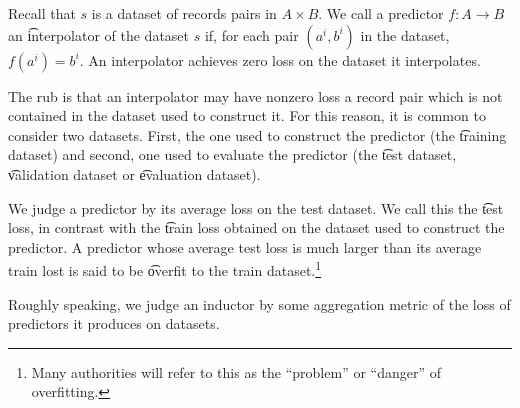 Recall that $s$ is a dataset of records pairs in $A \times B$.
We call a predictor $f: A \to B$ an \t{interpolator} of the dataset $s$ if, for each pair $(a^i, b^i)$ in the dataset, $f(a^i) = b^i$.
An interpolator achieves zero loss on the dataset it interpolates.

The rub is that an interpolator may have nonzero loss a record pair which is not contained in the dataset used to construct it.
For this reason, it is common to consider two datasets.
First, the one used to construct the predictor (the \t{training dataset}) and second, one used to evaluate the predictor (the \t{test dataset}, \t{validation dataset} or \t{evaluation dataset}).

We judge a predictor by its average loss on the test dataset.
We call this the \t{test loss}, in contrast with the \t{train loss} obtained on the dataset used to construct the predictor.
A predictor whose average test loss is much larger than its average train lost is said to be \t{overfit} to the train dataset.\footnote{Many authorities will refer to this as the ``problem'' or ``danger'' of overfitting.}

Roughly speaking, we judge an inductor by some aggregation metric of the loss of predictors it produces on datasets.
